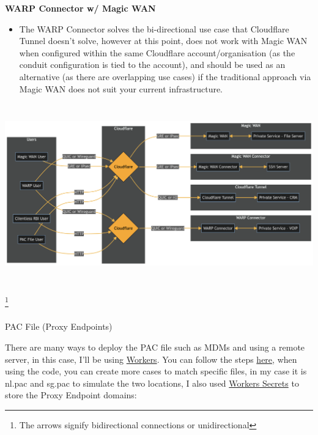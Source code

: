\documentclass[
]{article}
\makeatletter
\let\oldparagraph\paragraph
\renewcommand{\paragraph}{
    \@ifstar
      \xxxParagraphStar
      \xxxParagraphNoStar
  }
\newcommand{\xxxParagraphStar}[1]{\oldparagraph*{#1}\mbox{}}
\newcommand{\xxxParagraphNoStar}[1]{\oldparagraph{#1}\mbox{}}
\providecommand{\tightlist}{%
  \setlength{\itemsep}{0pt}\setlength{\parskip}{0pt}}\usepackage{longtable,booktabs,array}
\makeatother
\begin{document}
\begin{tcolorbox}
\textbf{WARP Connector w/ Magic WAN}

\begin{itemize}
\tightlist
\item
  The WARP Connector solves the bi-directional use case that Cloudflare
  Tunnel doesn't solve, however at this point, does not work with Magic
  WAN when configured within the same Cloudflare account/organisation
  (as the conduit configuration is tied to the account), and should be
  used as an alternative (as there are overlapping use cases) if the
  traditional approach via Magic WAN does not suit your current
  infrastructure.
\end{itemize}

\end{tcolorbox}

\includegraphics[width=6.5in,height=3.06in]{magic-interop_files/figure-latex/mermaid-figure-1.png}

\footnote{The arrows signify bidirectional connections or unidirectional}

\newpage{}

\paragraph{PAC File (Proxy Endpoints)}\label{pac-file-proxy-endpoints}

There are many ways to deploy the PAC file such as MDMs and using a
remote server, in this case, I'll be using
\href{https://github.com/erfianugrah/worker-proxy-pac}{Workers}. You can
follow the steps
\href{https://developers.cloudflare.com/cloudflare-one/connections/connect-devices/agentless/pac-files/}{here},
when using the code, you can create more cases to match specific files,
in my case it is nl.pac and sg.pac to simulate the two locations, I also
used
\href{https://developers.cloudflare.com/workers/configuration/secrets/}{Workers
Secrets} to store the Proxy Endpoint domains:
\end{document}
